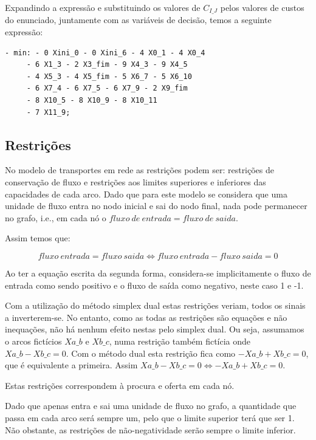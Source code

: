 Expandindo a expressão e substituindo os valores de $C_{I\_J}$ pelos valores de
custos do enunciado, juntamente com as variáveis de decisão, temos a seguinte
expressão:

\begin{verbatim}
- min: - 0 Xini_0 - 0 Xini_6 - 4 X0_1 - 4 X0_4
     - 6 X1_3 - 2 X3_fim - 9 X4_3 - 9 X4_5
     - 4 X5_3 - 4 X5_fim - 5 X6_7 - 5 X6_10
     - 6 X7_4 - 6 X7_5 - 6 X7_9 - 2 X9_fim
     - 8 X10_5 - 8 X10_9 - 8 X10_11
     - 7 X11_9;
\end{verbatim}

\subsection{Restrições}
\label{p1:sec:restricoes}

No modelo de transportes em rede as restrições podem ser: restrições de
conservação de fluxo e restrições aos limites superiores e inferiores das
capacidades de cada arco. Dado que para este modelo se considera que uma unidade
de fluxo entra no nodo inicial e sai do nodo final, nada pode permanecer no
grafo, i.e., em cada nó o $fluxo~de~entrada = fluxo~de~saida$.

Assim temos que:

\begin{displaymath}
fluxo~entrada = fluxo~saida \Leftrightarrow  fluxo~entrada - fluxo~saida = 0
\end{displaymath}

Ao ter a equação escrita da segunda forma, considera-se implicitamente o fluxo
de entrada como sendo positivo e o fluxo de saída como negativo, neste caso
1 e -1.

Com a utilização do método simplex dual estas restrições veriam, todos os sinais
a inverterem-se. No entanto, como as todas as restrições são equações e não
inequações, não há nenhum efeito nestas pelo simplex dual. Ou seja, assumamos
o arcos fictícios $Xa\_b$ e $Xb\_c$, numa restrição também fictícia onde $Xa\_b
- Xb\_c = 0$. Com o método dual esta restrição fica como $-Xa\_b + Xb\_c = 0$,
que é equivalente a primeira. Assim $Xa\_b - Xb\_c = 0 \Leftrightarrow -Xa\_b
+ Xb\_c = 0$.

Estas restrições correspondem à procura e oferta em cada nó.

Dado que apenas entra e sai uma unidade de fluxo no grafo, a quantidade que
passa em cada arco será sempre um, pelo que o limite superior terá que ser 1. Não
obstante, as restrições de não-negatividade serão sempre o limite inferior.


